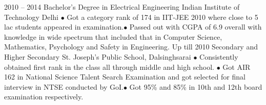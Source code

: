 \documentclass[9pt]{developercv} %
\begin{document}


\begin{entrylist}
	\entry
		{2010 -- 2014}
		{Bachelor’s  Degree in Electrical Engineering}
		{Indian Institute of Technology Delhi}
		{$\bullet$ Got a category rank of 174 in IIT-JEE 2010 where close to 5 lac students appeared in examination.$\bullet$  Passed out with CGPA of 6.9 overall with knowledge in wide spectrum that included that in Computer Science, Mathematics, Psychology and Safety in Engineering.}
	\entry
		{Up till 2010}
		{Secondary and Higher Secondary}
		{St. Joseph's Public School, Dalsinghsarai}
		{$\bullet$ Consistently obtained first rank in the class all through middle and high school. $\bullet$ Got AIR 162 in National Science Talent Search Examination and got selected for final interview in NTSE conducted by GoI.$\bullet$  Got 95\% and 85\% in 10th and 12th board examination respectively. }

\end{entrylist}


%	
%	
%	
%	
%	
%	

\end{document}
